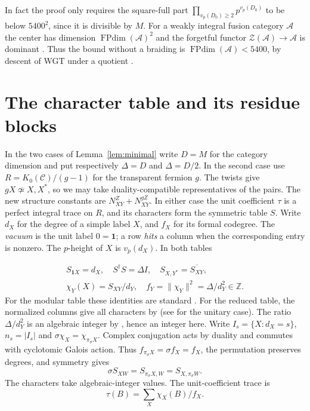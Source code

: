 \documentclass[11pt,a4paper]{article}
\numberwithin{equation}{section}
\theoremstyle{remark}
\newcommand{\C}{\mathcal C}
\newcommand{\Z}{\mathcal Z}
\newcommand{\one}{\mathbf1}
\newcommand{\FPdim}{\operatorname{FPdim}}
\newcommand{\ZZ}{\mathbb Z}
\begin{document}
In fact the proof only requires the square-full part
$\prod_{v_p(D_0)\ge2}p^{v_p(D_0)}$ to be below $5400^2$, since it
is divisible by $M$. For a weakly integral fusion category $\mathcal A$ the center
has dimension $\FPdim(\mathcal A)^2$ and the forgetful functor
$\Z(\mathcal A)\to\mathcal A$ is dominant
\cite[Corollary~7.13.11 and Theorem~7.16.6]{EGNO}. Thus the bound without a
braiding is $\FPdim(\mathcal A)<5400$, by descent of WGT under a quotient
\cite[Proposition~4.1]{ENOsolvable}.

\section{The character table and its residue blocks}
In the two cases of Lemma~\ref{lem:minimal} write $D=M$ for the category dimension and put respectively $\Delta=D$ and $\Delta=D/2$.
In the second case use $R=K_0(\C)/(g-1)$ for the transparent fermion $g$.
The twists give $gX\not\simeq X,X^*$, so we may take duality-compatible representatives
of the pairs. The new structure constants are $N_{XY}^Z+N_{XY}^{gZ}$.
In either case the unit coefficient $\tau$ is a perfect integral trace on $R$,
and its characters form the symmetric table $S$.
Write $d_X$ for the degree of a simple label $X$, and $f_X$ for its formal codegree. The \emph{vacuum} is the unit label $0=\one$; a row \emph{hits} a column when the corresponding entry is nonzero. The $p$-height of $X$ is $v_p(d_X)$. In both tables

\begin{equation}
 \begin{gathered}S_{\one X}=d_X,\quad S^\dagger S=\Delta I,\quad S_{X,Y^*}=\overline{S_{XY}},\\
 \chi_Y(X)=S_{XY}/d_Y,\quad f_Y=\|\chi_Y\|^2=\Delta/d_Y^2\in\ZZ.\end{gathered}
\end{equation}
For the modular table these identities are standard \cite[Sections~8.13--8.14]{EGNO}. For the reduced table, the normalized columns give all characters by \cite[Proposition~3.3]{YuSlightlyDegenerate} (see \cite[Proposition~2.7]{BGNPWSuper} for the unitary case). The ratio $\Delta/d_Y^2$ is an algebraic integer by \cite[Corollary~3.4]{YuSlightlyDegenerate}, hence an integer here. Write $I_s=\{X:d_X=s\}$, $n_s=|I_s|$ and $\sigma\chi_X=\chi_{\pi_\sigma X}$. Complex conjugation acts by duality and commutes with cyclotomic Galois action. Thus $f_{\pi_\sigma X}=\sigma f_X=f_X$, the permutation preserves degrees, and symmetry gives
\begin{equation}\label{eq:galois-permutations}
 \sigma S_{XW}=S_{\pi_\sigma X,W}=S_{X,\pi_\sigma W}.
\end{equation}
The characters take algebraic-integer values. The unit-coefficient trace is
\begin{equation}\label{eq:fusion-coefficient-trace}
 \tau(B)=\sum_X\chi_X(B)/f_X .
\end{equation}
\end{document}
